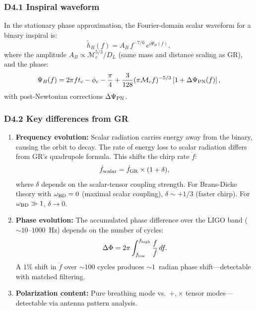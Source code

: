 \documentclass[reprint]{revtex4-2}
\begin{document}
\subsubsection{D4.1 Inspiral waveform}

In the stationary phase approximation, the Fourier-domain scalar waveform for a binary inspiral is:
\begin{equation}
\tilde{h}_B(f) = A_B\,f^{-7/6}\,e^{i\Psi_B(f)},
\end{equation}
where the amplitude $A_B \propto \mathcal{M}_c^{5/3}/D_L$ (same mass and distance scaling as GR), and the phase:
\begin{equation}
\Psi_B(f) = 2\pi f t_c - \phi_c - \frac{\pi}{4} + \frac{3}{128}(\pi\mathcal{M}_c f)^{-5/3}\left[1 + \Delta\Psi_{\rm PN}(f)\right],
\end{equation}
with post-Newtonian corrections $\Delta\Psi_{\rm PN}$.

\subsubsection{D4.2 Key differences from GR}

\begin{enumerate}[label=(\roman*)]
\item \textbf{Frequency evolution:} Scalar radiation carries energy away from the binary, causing the orbit to decay. The rate of energy loss to scalar radiation differs from GR's quadrupole formula. This shifts the chirp rate $\dot{f}$:
   \begin{equation}
   \dot{f}_{\rm scalar} = \dot{f}_{\rm GR}\times(1 + \delta),
   \end{equation}
   where $\delta$ depends on the scalar-tensor coupling strength. For Brans-Dicke theory with $\omega_{\rm BD}=0$ (maximal scalar coupling), $\delta \sim +1/3$ (faster chirp). For $\omega_{\rm BD} \gg 1$, $\delta \to 0$.

\item \textbf{Phase evolution:} The accumulated phase difference over the LIGO band ($\sim 10$--$1000$~Hz) depends on the number of cycles:
   \begin{equation}
   \Delta\Phi = 2\pi\int_{f_{\rm low}}^{f_{\rm high}} \frac{f}{\dot{f}}\,df.
   \end{equation}
   A $1\%$ shift in $\dot{f}$ over $\sim 100$ cycles produces $\sim 1$~radian phase shift---detectable with matched filtering.

\item \textbf{Polarization content:} Pure breathing mode vs.\ $+,\times$ tensor modes---detectable via antenna pattern analysis.
\end{enumerate}
\end{document}
